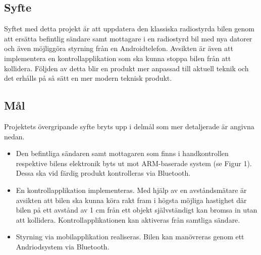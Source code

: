 \documentclass[a4paper]{article}
\begin{document}
\subsection{Syfte}

Syftet med detta projekt är att uppdatera den klassiska radiostyrda bilen genom att ersätta befintlig sändare samt mottagare i en radiostyrd bil med nya datorer och även möjliggöra styrning från en Androidtelefon. Avsikten är även att implementera en kontrollapplikation som ska kunna stoppa bilen från att kollidera. Följden av detta blir en produkt mer anpassad till aktuell teknik och det erhålls på så sätt en mer modern teknisk produkt.



\subsection{Mål}
Projektets övergripande syfte bryts upp i delmål som mer detaljerade är angivna nedan.

\begin{itemize}
\item Den befintliga sändaren samt mottagaren som finns i handkontrollen respektive bilens elektronik byts ut mot ARM-baserade system (se Figur 1). Dessa ska vid färdig produkt kontrolleras via Bluetooth.
\item En kontrollapplikation implementeras. Med hjälp av en avståndsmätare är avsikten att bilen ska kunna köra rakt fram i högsta möjliga hastighet där bilen på ett avstånd av 1 cm från ett objekt självständigt kan bromsa in utan att kollidera. Kontrollapplikationen kan aktiveras från samtliga sändare.
\item Styrning via mobilapplikation realiseras. Bilen kan manövreras genom ett Andriodsystem via Bluetooth.
\end{itemize}
\end{document}

